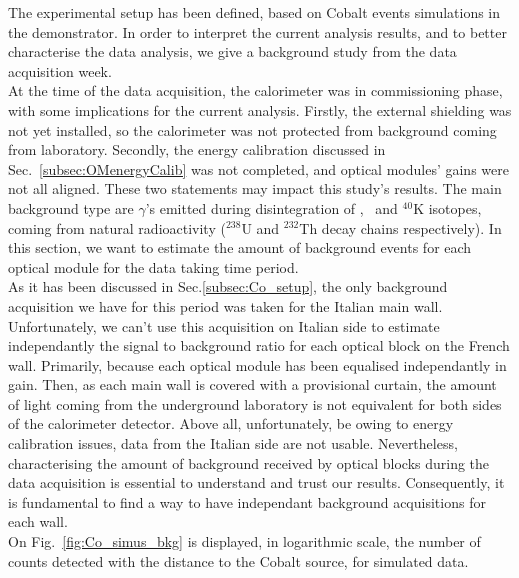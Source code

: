 The experimental setup has been defined, based on Cobalt events simulations in the demonstrator.
In order to interpret the current analysis results, and to better characterise the data analysis, we give a background study from the data acquisition week.\\
\newline
At the time of the data acquisition, the calorimeter was in commissioning phase, with some implications for the current analysis.
Firstly, the external shielding was not yet installed, so the calorimeter was not protected from background coming from laboratory.
Secondly, the energy calibration discussed in Sec.~\ref{subsec:OMenergyCalib} was not completed, and optical modules' gains were not all aligned.
These two statements may impact this study's results.
The main background type are $\gamma$'s emitted during disintegration of \Tl , \Bi\ and $^{40}$K isotopes, coming from natural radioactivity ($^{238}$U and $^{232}$Th decay chains respectively).
In this section, we want to estimate the amount of background events for each optical module for the data taking time period.\\
\newline
As it has been discussed in Sec.\ref{subsec:Co_setup}, the only background acquisition we have for this period was taken for the Italian main wall.
Unfortunately, we can't use this acquisition on Italian side to estimate independantly the signal to background ratio for each optical block on the French wall.
Primarily, because each optical module has been equalised independantly in gain.
Then, as each main wall is covered with a provisional curtain, the amount of light coming from the underground laboratory is not equivalent for both sides of the calorimeter detector.
Above all, unfortunately, be owing to energy calibration issues, data from the Italian side are not usable.
Nevertheless, characterising the amount of background received by optical blocks during the data acquisition is essential to understand and trust our results.
Consequently, it is fundamental to find a way to have independant background acquisitions for each wall.\\
\newline
On Fig.~\ref{fig:Co_simus_bkg} is displayed, in logarithmic scale, the number of counts detected with the distance to the Cobalt source, for simulated data.
